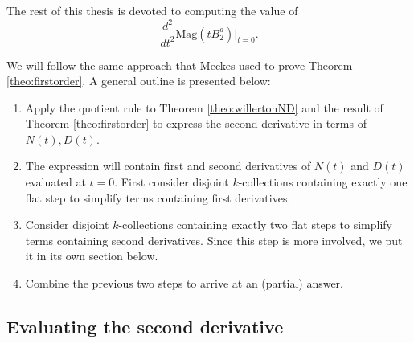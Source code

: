 \documentclass[11pt]{article}
\theoremstyle{mythm}
\begin{document}
The rest of this thesis is devoted to computing the value of
\begin{equation*}
\frac{d^2}{dt^2}\text{Mag}(tB_2^d)\big\vert_{t=0}.
\end{equation*}

We will follow the same approach that Meckes used to prove Theorem \ref{theo:firstorder}. A general outline is presented below:
\begin{enumerate}[label=\arabic*.]
\item Apply the quotient rule to Theorem \ref{theo:willertonND} and the result of Theorem \ref{theo:firstorder} to express the second derivative in terms of $N(t),D(t)$.
\item The expression will contain first and second derivatives of $N(t)$ and $D(t)$ evaluated at $t = 0$. First consider disjoint $k$-collections containing exactly one flat step to simplify terms containing first derivatives.
\item Consider disjoint $k$-collections containing exactly two flat steps to simplify terms containing second derivatives. Since this step is more involved, we put it in its own section below.
\item Combine the previous two steps to arrive at an (partial) answer.
\end{enumerate}

\subsection{Evaluating the second derivative}
\end{document}
